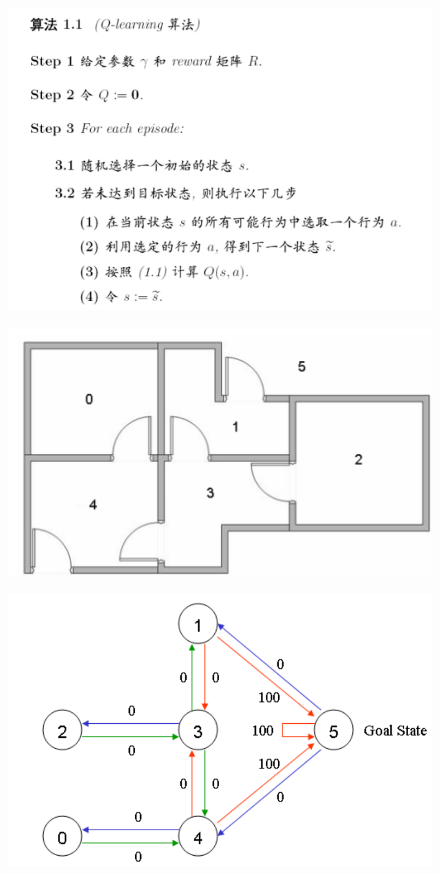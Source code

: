 \documentclass[11pt]{article}
\makeatletter
\def\maxwidth{\ifdim\Gin@nat@width>\linewidth\linewidth
    \else\Gin@nat@width\fi}
\let\Oldincludegraphics\includegraphics
\renewcommand{\includegraphics}[1]{\Oldincludegraphics[width=.8\maxwidth]{#1}}
\makeatother
\begin{document}
\begin{figure}
\centering
\includegraphics{Q-learning.png}
\caption{}
\end{figure}

    \begin{figure}
\centering
\includegraphics{door.png}
\caption{}
\end{figure}

    \begin{figure}
\centering
\includegraphics{door-state.png}
\caption{}
\end{figure}
\end{document}
